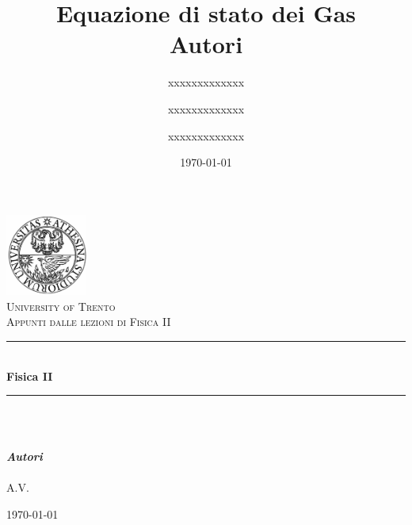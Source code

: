 \documentclass[11pt]{article}
\title{\textbf{Equazione di stato dei Gas}\\ Autori}
\author{ xxxxxxxxxxxxx\and
		xxxxxxxxxxxxx\and
		xxxxxxxxxxxxx}
\date{\today}
\newcommand{\HRule}{\rule{\linewidth}{0.5mm}}
\begin{document}
\begin{titlepage}
\begin{center}

\includegraphics[width=0.20\textwidth]{./Logo1}~\\[1cm]

\textsc{\LARGE University of Trento}\\[1.5cm]

\textsc{\Large Appunti dalle lezioni di Fisica II}\\[0.5cm]
\vspace{30pt}
\HRule \\[0.4cm]
\vspace{15pt}
{ \huge \bfseries Fisica II}\\[0.4cm]
\vspace{15pt}
\HRule \\[1.5cm]
\vspace{30pt}
~~~~~~~~~~~~~~~~~~~~~\begin{minipage}{0.4\textwidth}
\large
\emph{\large\textbf{Autori}}\\ \\ 
A.\textsc{V.}
\end{minipage}

\vfill

{\large \today}

\end{center}
\end{titlepage}\newpage
\tableofcontents
\newpage
\vspace{40pt}
~\\
\end{document}
